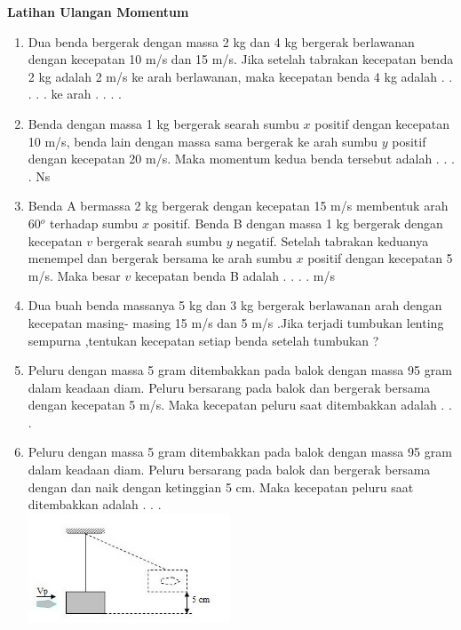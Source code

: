 \documentclass[10pt,a4paper]{extarticle}
\begin{document}
 \textbf{Latihan Ulangan Momentum} \phantom{ini nama siswa yang aaamengerjakan soal kuis ini }  

\begin{multicols*}{2}

\begin{enumerate}
\item Dua benda bergerak dengan massa 2 kg dan 4 kg bergerak berlawanan dengan kecepatan 10 m/s dan 15 m/s. Jika setelah tabrakan kecepatan benda 2 kg adalah 2 m/s ke arah berlawanan, maka kecepatan benda 4 kg adalah . . . . . ke arah . . . .
\vspace{3cm}

\item Benda dengan massa 1 kg bergerak searah sumbu $x$ positif dengan kecepatan 10 m/s, benda lain dengan massa sama bergerak ke arah sumbu $y$ positif dengan kecepatan 20 m/s. Maka momentum kedua benda tersebut adalah . .  . .  Ns
\vspace{3.5cm}


\item Benda A bermassa 2 kg bergerak dengan kecepatan 15 m/s membentuk arah 60$^o$ terhadap sumbu $x$ positif. Benda B dengan massa 1 kg bergerak dengan kecepatan $v$ bergerak searah sumbu $y$ negatif. Setelah tabrakan keduanya menempel dan bergerak bersama ke arah sumbu $x$ positif dengan kecepatan 5 m/s. Maka besar $v$ kecepatan benda B adalah . . . . m/s
\vspace{4cm}



\item Dua buah benda massanya 5 kg dan 3 kg bergerak berlawanan arah dengan kecepatan masing-   masing 15 m/s dan 5 m/s .Jika terjadi tumbukan lenting sempurna ,tentukan kecepatan setiap benda setelah tumbukan ?
\vspace{4.5cm}



\item Peluru dengan massa 5 gram ditembakkan pada balok dengan massa 95 gram dalam keadaan diam. Peluru bersarang pada balok dan bergerak bersama dengan kecepatan 5 m/s. Maka kecepatan peluru saat ditembakkan adalah . . .
\vspace{3cm}

\item Peluru dengan massa 5 gram ditembakkan pada balok dengan massa 95 gram dalam keadaan diam. Peluru bersarang pada balok dan bergerak bersama dengan dan naik dengan ketinggian 5 cm. Maka kecepatan peluru saat ditembakkan adalah . . .\\
\includegraphics[width=6cm]{pic/latul-mom1} 
\vspace{2cm}




\end{enumerate}
\end{multicols*}
\end{document}
